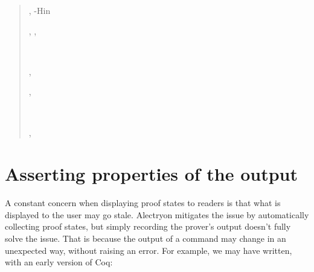 \documentclass[a4paper]{article}
\begin{document}
\begin{quote}
\begin{alectryon}
\begin{sentence}
\begin{output}
\begin{goals}
\begin{extragoals}
\begin{goal}
\begin{hyps}
              \sep
              \hyp{Hin}{~~}
            \end{hyps}
            \sep
            \infrule{}
            \sep
            \begin{conclusion}
              ~~
            \end{conclusion}
          \end{goal}
        \end{extragoals}
      \end{goals}
    \end{output}
  \end{sentence}
  \sep
  \begin{txt}
    \nl
  \end{txt}
  \sep
  \begin{sentence}
    \begin{input}
      ~~~~~~\nl
    \end{input}
  \end{sentence}
  \sep
  \begin{sentence}
    \begin{input}
    \end{input}
  \end{sentence}
\end{alectryon}
\end{quote}


\section{Asserting properties of the output%
  \label{asserting-properties-of-the-output}%
}

A constant concern when displaying proof states to readers is that what is displayed to the user may go stale.  Alectryon mitigates the issue by automatically collecting proof states, but simply recording the prover's output doesn't fully solve the issue.  That is because the output of a command may change in an unexpected way, without raising an error.  For example, we may have written, with an early version of Coq:
\end{document}

